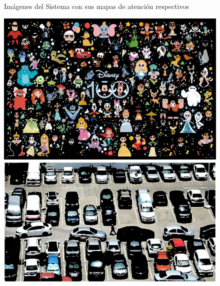 \begin{figure}[H]
\begin{minipage}[hb]{0.3\textwidth}
	\end{minipage}
	\caption{Imágenes del Sistema con sus mapas de atenci\'on respectivos }
	\label{fig:saliency-map}
\end{figure}

\begin{figure}[H]
	\centering
	\begin{minipage}[hb]{0.3\textwidth}
		\centering
		\includegraphics[width=\textwidth]{Graphics/disney-selected-regions.jpg}
	\end{minipage}
	\hfill
	\begin{minipage}[hb]{0.3\textwidth}
		\centering
		\includegraphics[width=\textwidth]{Graphics/cars-selected-regions.jpg}
	\end{minipage}
	\hfill
	\begin{minipage}[hb]{0.3\textwidth}
		\centering

\end{minipage}
\end{figure}
